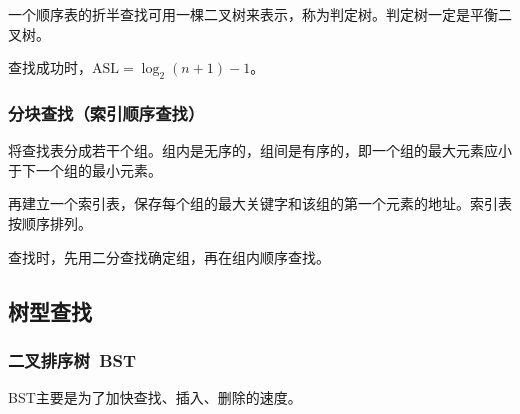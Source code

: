 \documentclass[12pt, a4paper, oneside]{ctexart}
\begin{document}
一个顺序表的折半查找可用一棵二叉树来表示，称为判定树。判定树一定是平衡二叉树。

查找成功时，$\text{ASL}=\log_2 (n+1)-1$。

\subsubsection{分块查找（索引顺序查找）}

将查找表分成若干个组。组内是无序的，组间是有序的，即一个组的最大元素应小于下一个组的最小元素。

再建立一个索引表，保存每个组的最大关键字和该组的第一个元素的地址。索引表按顺序排列。

查找时，先用二分查找确定组，再在组内顺序查找。

\subsection{树型查找}

\subsubsection{二叉排序树\ BST}

BST主要是为了加快查找、插入、删除的速度。
\end{document}
